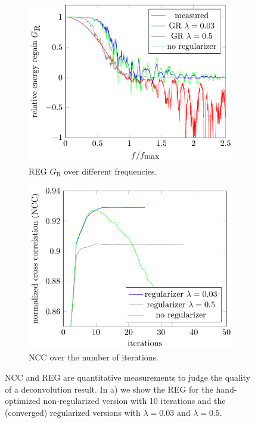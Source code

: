 \documentclass{juliacon}
\begin{document}
        \begin{figure}[h]
            \centering
            \begin{subfigure}[b]{.23\textwidth}
                \centering
                \includegraphics[width =\textwidth]{figures/test_chart_relative_energy_regain.png}
                \caption{REG $G_\textrm{R}$ over different frequencies.}
                \label{fig:rel_energy_regain}
            \end{subfigure}
            \hfill
            \begin{subfigure}[b]{.23\textwidth}
                \centering
                \includegraphics[width =1 \textwidth]{figures/test_chart_ncc.png}
                \caption{NCC over the number of iterations.}
                \label{fig:ncc}
            \end{subfigure}
            \caption{NCC and REG are quantitative measurements to judge the quality of a deconvolution result. 
                In a) we show the REG for the hand-optimized non-regularized version with 10 iterations and the (converged) regularized versions with $\lambda=0.03$ and $\lambda=0.5$.}
        \end{figure}
\end{document}

